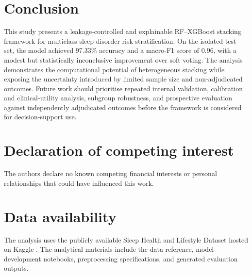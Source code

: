 ﻿\documentclass[preprint,12pt]{elsarticle}
\begin{document}
\FloatBarrier
\section{Conclusion}
This study presents a leakage-controlled and explainable RF--XGBoost stacking framework for multiclass sleep-disorder risk stratification. On the isolated test set, the model achieved 97.33\% accuracy and a macro-F1 score of 0.96, with a modest but statistically inconclusive improvement over soft voting. The analysis demonstrates the computational potential of heterogeneous stacking while exposing the uncertainty introduced by limited sample size and non-adjudicated outcomes. Future work should prioritise repeated internal validation, calibration and clinical-utility analysis, subgroup robustness, and prospective evaluation against independently adjudicated outcomes before the framework is considered for decision-support use.

\section*{Declaration of competing interest}
The authors declare no known competing financial interests or personal relationships that could have influenced this work.

\section*{Data availability}
The analysis uses the publicly available Sleep Health and Lifestyle Dataset hosted on Kaggle \cite{kaggle2023}. The analytical materials include the data reference, model-development notebooks, preprocessing specifications, and generated evaluation outputs.

\FloatBarrier


\end{document}
